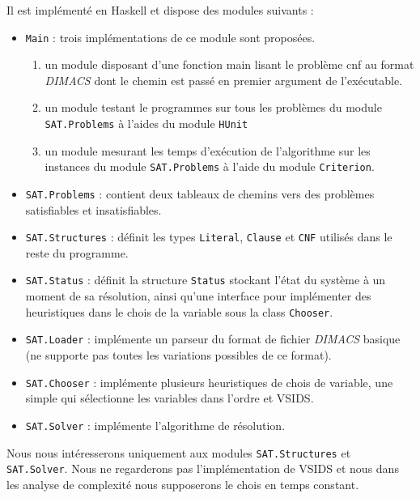 Il est implémenté en Haskell et dispose des modules suivants :
\begin{itemize}
    \item \texttt{Main} : trois implémentations de ce module sont proposées.
        \begin{enumerate}
                \item un module disposant d'une fonction main lisant le
                    problème cnf au format \emph{DIMACS} dont le chemin est
                    passé en premier argument de l'exécutable.
                \item un module testant le programmes sur tous les problèmes
                    du module \texttt{SAT.Problems} à l'aides du module
                    \texttt{HUnit}
                \item un module mesurant les temps d'exécution de l'algorithme
                    sur les instances du module \texttt{SAT.Problems} à l'aide
                    du module \texttt{Criterion}.
        \end{enumerate}
    \item \texttt{SAT.Problems} : contient deux tableaux de chemins vers des
        problèmes satisfiables et insatisfiables.
    \item \texttt{SAT.Structures} : définit les types \texttt{Literal},
        \texttt{Clause} et \texttt{CNF} utilisés dans le reste du programme.
    \item \texttt{SAT.Status} : définit la structure \texttt{Status} stockant
        l'état du système à un moment de sa résolution, ainsi qu'une interface
        pour implémenter des heuristiques dans le chois de la variable sous
        la class \texttt{Chooser}.
    \item \texttt{SAT.Loader} : implémente un parseur du format de fichier
        \emph{DIMACS} basique (ne supporte pas toutes les variations
        possibles de ce format).
    \item \texttt{SAT.Chooser} : implémente plusieurs heuristiques de chois
        de variable, une simple qui sélectionne les variables dans l'ordre
        et VSIDS.
    \item \texttt{SAT.Solver} : implémente l'algorithme de résolution.
\end{itemize}

Nous nous intéresserons uniquement aux modules \texttt{SAT.Structures} et
\texttt{SAT.Solver}. Nous ne regarderons pas l'implémentation de VSIDS et nous
dans les analyse de complexité nous supposerons le chois en temps constant.

